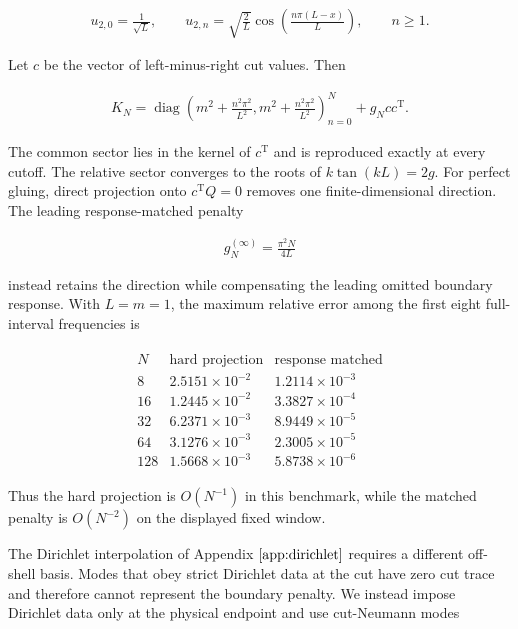 \begin{align}
u_{2,0}=\frac1{\sqrt L},
\qquad
u_{2,n}=\sqrt{\frac2L}\cos\!\left(\frac{n\pi(L-x)}L\right),
\qquad n\geq1.
\end{align}

Let $c$ be the vector of left-minus-right cut values. Then

\begin{align}
K_N
=\operatorname{diag}\!\left(
m^2+\frac{n^2\pi^2}{L^2},
m^2+\frac{n^2\pi^2}{L^2}
\right)_{n=0}^{N}
+g_Ncc^{\mathrm T}.
\end{align}

The common sector lies in the kernel of $c^{\mathrm T}$ and is reproduced exactly at every cutoff. The relative sector converges to the roots of $k\tan(kL)=2g$. For perfect gluing, direct projection onto $c^{\mathrm T}Q=0$ removes one finite-dimensional direction. The leading response-matched penalty

\begin{align}
g_N^{(\infty)}=\frac{\pi^2N}{4L}
\end{align}

instead retains the direction while compensating the leading omitted boundary response. With $L=m=1$, the maximum relative error among the first eight full-interval frequencies is

\begin{align}
\begin{array}{c|cc}
N & \text{hard projection} & \text{response matched} \\ \hline
8   & 2.5151\times10^{-2} & 1.2114\times10^{-3} \\
16  & 1.2445\times10^{-2} & 3.3827\times10^{-4} \\
32  & 6.2371\times10^{-3} & 8.9449\times10^{-5} \\
64  & 3.1276\times10^{-3} & 2.3005\times10^{-5} \\
128 & 1.5668\times10^{-3} & 5.8738\times10^{-6}
\end{array}
\end{align}

Thus the hard projection is $O(N^{-1})$ in this benchmark, while the matched penalty is $O(N^{-2})$ on the displayed fixed window.

The Dirichlet interpolation of Appendix $\ref{app:dirichlet}$ requires a different off-shell basis. Modes that obey strict Dirichlet data at the cut have zero cut trace and therefore cannot represent the boundary penalty. We instead impose Dirichlet data only at the physical endpoint and use cut-Neumann modes

